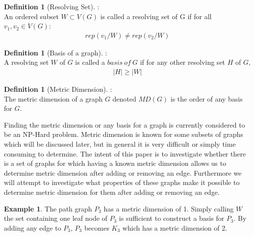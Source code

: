 \documentclass[11pt]{amsart}
\theoremstyle{plain}  %
\theoremstyle{definition}
\newtheorem{defin}[thm]{{Definition}}
\newtheorem{ex}[thm]{Example}
\theoremstyle{remark}
\numberwithin{equation}{thm}
\begin{document}
 \begin{defin}[Resolving Set]:\\
  An ordered subset $W \subset V(G)$ is called a resolving set of G if for all $v_1, v_2 \in V(G)$: 
  \begin{align*}
  rep(v_1/W) \neq  rep(v_2/W)
  \end{align*}
 \end{defin}
 
 \begin{defin}[Basis of a graph]:\\
  A resolving set $W$ of $G$ is called a $basis\ of\ G$ if for any other resolving set $H$ of $G$, 
  \begin{align*}
   |H| \geq |W|
  \end{align*}

 \end{defin}
 
 \begin{defin}[Metric Dimension]:\\
  The metric dimension of a graph $G$ denoted $MD(G)$ is the order of any basis for $G$.
 \end{defin}


Finding the metric dimension or any basis for a graph is currently considered to be an NP-Hard problem. 
Metric dimension is known for some subsets of graphs which will be discussed later, but in general it is very difficult or simply time consuming to determine.
The intent of this paper is to investigate whether there is a set of graphs for which having a known metric dimension allows us to determine metric dimension after adding or removing an edge.
Furthermore we will attempt to investigate what properties of these graphs make it possible to determine metric dimension for them after adding or removing an edge.
\begin{ex}
 The path graph $P_3$ has a metric dimension of 1. Simply calling $W$ the set containing one leaf node of $P_3$ is sufficient to construct a basis for $P_3$.
 By adding any edge to $P_3$, $P_3$ becomes $K_3$ which has a metric dimension of 2.
\end{ex}
\end{document}
